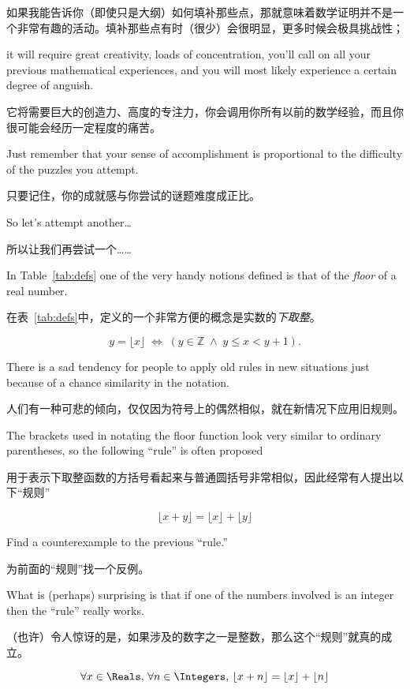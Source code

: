 如果我能告诉你（即使只是大纲）如何填补那些点，那就意味着数学证明并不是一个非常有趣的活动。填补那些点有时（很少）会很明显，更多时候会极具挑战性；

it will require great creativity, loads of concentration, you'll call on 
all your previous mathematical experiences, and you will most likely
experience a certain degree of anguish.

它将需要巨大的创造力、高度的专注力，你会调用你所有以前的数学经验，而且你很可能会经历一定程度的痛苦。

Just remember that your sense 
of accomplishment is proportional to the difficulty of the puzzles you 
attempt.

只要记住，你的成就感与你尝试的谜题难度成正比。

So let's attempt another\ldots

所以让我们再尝试一个……

In Table~\ref{tab:defs} one of the very handy notions defined is that 
of the \emph{floor} of a real number.

在表~\ref{tab:defs}中，定义的一个非常方便的概念是实数的\emph{下取整}。

\[ y = \lfloor x \rfloor \; \iff \; (y \in \mathbb Z \; \land \; y \leq x < y+1).\]

There is a sad tendency for people to apply old rules in new situations 
just because of a chance similarity in the notation.

人们有一种可悲的倾向，仅仅因为符号上的偶然相似，就在新情况下应用旧规则。

The brackets used 
in notating the floor function look very similar to ordinary parentheses, 
so the following ``rule'' is often proposed

用于表示下取整函数的方括号看起来与普通圆括号非常相似，因此经常有人提出以下“规则”

\[ \lfloor x + y \rfloor = \lfloor x \rfloor + \lfloor y \rfloor \]

\begin{exer} 
Find a counterexample to the previous ``rule.''

为前面的“规则”找一个反例。
\end{exer}

What is (perhaps) surprising is that if one of the numbers involved is an
integer then the ``rule'' really works.

（也许）令人惊讶的是，如果涉及的数字之一是整数，那么这个“规则”就真的成立。

\begin{thm}
\[ \forall x \in \Reals, \, \forall n \in \Integers, \, 
\lfloor x + n \rfloor = \lfloor x \rfloor + \lfloor n \rfloor \]
\end{thm}

